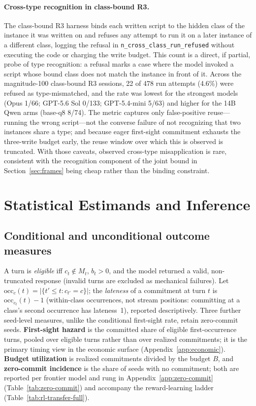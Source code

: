 \documentclass{article}
\begin{document}
\paragraph{Cross-type recognition in class-bound R3.} The class-bound R3 harness binds each written script to the hidden class of the instance it was written on and refuses any attempt to run it on a later instance of a different class, logging the refusal in \texttt{n\_cross\_class\_run\_refused} without executing the code or charging the write budget. This count is a direct, if partial, probe of type recognition: a refusal marks a case where the model invoked a script whose bound class does not match the instance in front of it. Across the magnitude-100 class-bound R3 sessions, 22 of 478 run attempts (4.6\%) were refused as type-mismatched, and the rate was lowest for the strongest models (Opus 1/66; GPT-5.6 Sol 0/133; GPT-5.4-mini 5/63) and higher for the 14B Qwen arms (base-q8 8/74). The metric captures only false-positive reuse---running the wrong script---not the converse failure of not recognizing that two instances share a type; and because eager first-sight commitment exhausts the three-write budget early, the reuse window over which this is observed is truncated. With those caveats, observed cross-type misapplication is rare, consistent with the recognition component of the joint bound in Section~\ref{sec:frames} being cheap rather than the binding constraint.

\section{Statistical Estimands and Inference} \label{app:bootstrap}

\subsection{Conditional and unconditional outcome measures}

A turn is \emph{eligible} iff $c_t \notin M_t$, $b_t > 0$, and the model returned a valid, non-truncated response (invalid turns are excluded as mechanical failures). Let $\mathrm{occ}_c(t) = |\{t' \le t : c_{t'} = c\}|$; the \emph{lateness} of a commitment at turn $t$ is $\mathrm{occ}_{c_t}(t) - 1$ (within-class occurrences, not stream positions: committing at a class's second occurrence has lateness~1), reported descriptively. Three further seed-level measures, unlike the conditional first-sight rate, retain zero-commit seeds. \textbf{First-sight hazard} is the committed share of eligible first-occurrence turns, pooled over eligible turns rather than over realized commitments; it is the primary timing view in the economic surface (Appendix~\ref{app:economic}). \textbf{Budget utilization} is realized commitments divided by the budget $B$, and \textbf{zero-commit incidence} is the share of seeds with no commitment; both are reported per frontier model and rung in Appendix~\ref{app:zero-commit} (Table~\ref{tab:zero-commit}) and accompany the reward-learning ladder (Table~\ref{tab:rl-transfer-full}).
\end{document}
